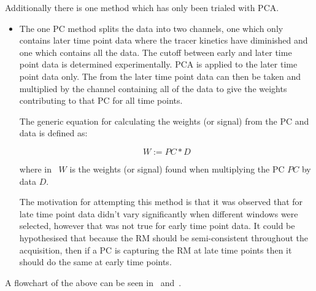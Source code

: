                     Additionally there is one method which has only been trialed with \gls{PCA}.
                    
                    \begin{itemize}
                        \item The one \gls{PC} method splits the data into two channels, one which only contains later time point data where the tracer kinetics have diminished and one which contains all the data. The cutoff between early and later time point data is determined experimentally. \gls{PCA} is applied to the later time point data only. The  from the later time point data can then be taken and multiplied by the channel containing all of the data to give the weights contributing to that \gls{PC} for all time points.
                        
                        The generic equation for calculating the weights (or signal) from the \gls{PC} and data is defined as:

                        \begin{equation} \label{eq:pca_data_driven_surrogate_signal_extraction_methods_for_dynamic_pet_methods_pc_weights}
                            W := PC * D
                        \end{equation}
        
                        \noindent where in~ $W$ is the weights (or signal) found when multiplying the \gls{PC} $PC$ by data $D$.
                        
                        The motivation for attempting this method is that it was observed that  for late time point data didn't vary significantly when different windows were selected, however that was not true for early time point data. It could be hypothesised that because the \gls{RM} should be semi-consistent throughout the acquisition, then if a \gls{PC} is capturing the \gls{RM} at late time points then it should do the same at early time points.
                    \end{itemize}
                    
                    A flowchart of the above can be seen in~ and~.
                
